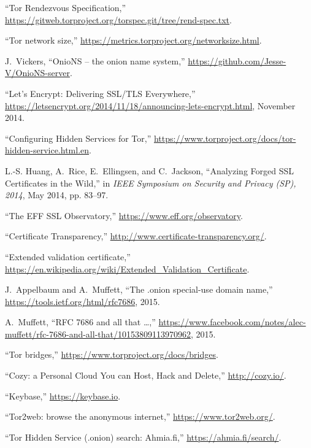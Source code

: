 \documentclass[10pt]{styles/IEEEtran}
\begin{document}
\begin{thebibliography}{10}
``{Tor Rendezvous Specification},''
  \url{https://gitweb.torproject.org/torspec.git/tree/rend-spec.txt}.

``Tor network size,'' \url{https://metrics.torproject.org/networksize.html}.

J.~Vickers, ``{OnioNS} -- the onion name system,''
  \url{https://github.com/Jesse-V/OnioNS-server}.

``{Let's Encrypt: Delivering SSL/TLS Everywhere},''
  \url{https://letsencrypt.org/2014/11/18/announcing-lets-encrypt.html},
  November 2014.

``{Configuring Hidden Services for Tor},''
  \url{https://www.torproject.org/docs/tor-hidden-service.html.en}.

L.-S. Huang, A.~Rice, E.~Ellingsen, and C.~Jackson, ``{Analyzing Forged SSL
  Certificates in the Wild},'' in \emph{IEEE Symposium on Security and Privacy
  (SP), 2014}, May 2014, pp. 83--97.

``{The EFF SSL Observatory},'' \url{https://www.eff.org/observatory}.

``{Certificate Transparency},'' \url{http://www.certificate-transparency.org/}.

``Extended validation certificate,''
  \url{https://en.wikipedia.org/wiki/Extended_Validation_Certificate}.

J.~Appelbaum and A.~Muffett, ``The .onion special-use domain name,''
  \url{https://tools.ietf.org/html/rfc7686}, 2015.

A.~Muffett, ``{RFC} 7686 and all that \ldots,''
  \url{https://www.facebook.com/notes/alec-muffett/rfc-7686-and-all-that/10153809113970962},
  2015.

``Tor bridges,'' \url{https://www.torproject.org/docs/bridges}.

``{Cozy: a Personal Cloud You can Host, Hack and Delete},''
  \url{http://cozy.io/}.

``Keybase,'' \url{https://keybase.io}.

``{Tor2web: browse the anonymous internet},'' \url{https://www.tor2web.org/}.

``{Tor Hidden Service (.onion) search: Ahmia.fi},''
  \url{https://ahmia.fi/search/}.


\end{thebibliography}
\end{document}
